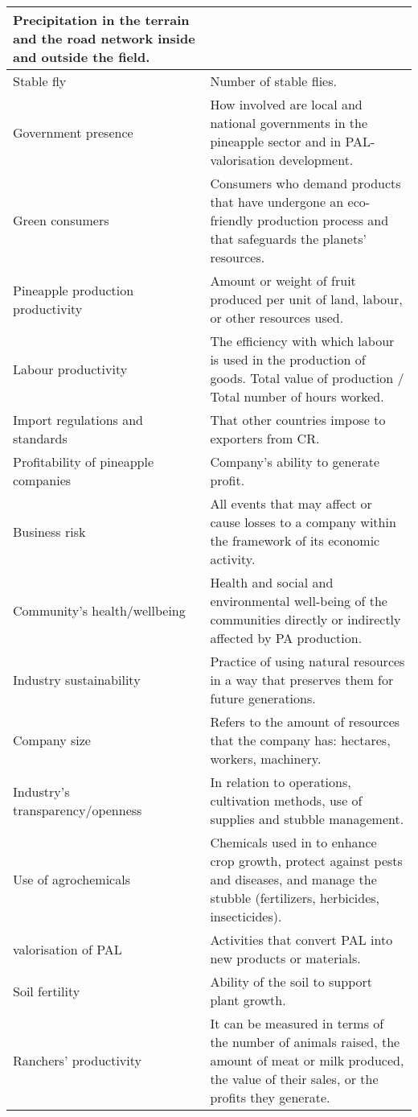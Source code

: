 \begin{xltabular}{\textwidth}{XX}
  Precipitation in the terrain and the road network inside and outside the field. \\ \hline
Stable fly &
  Number of stable flies. \\ \hline
Government presence &
  How involved are local and national governments in the pineapple sector and in PAL-valorisation development. \\ \hline
Green consumers &
  Consumers who demand products that have undergone an eco-friendly production process and that safeguards the planets' resources. \\ \hline
Pineapple production productivity &
  Amount or weight of fruit produced per unit of land, labour, or other resources used. \\ \hline
Labour productivity &
  The efficiency with which labour is used in the production of goods. Total value of production / Total number of hours worked. \\ \hline
Import regulations and standards &
  That other countries impose to exporters from CR. \\ \hline
Profitability of pineapple companies &
  Company's ability to generate profit. \\ \hline
Business risk &
  All events that may affect or cause losses to a company within the framework of its economic activity. \\ \hline
Community's health/wellbeing &
  Health and social and environmental well-being of the communities directly or indirectly affected by PA production. \\ \hline
Industry sustainability &
  Practice of using natural resources in a way that preserves them for future generations. \\ \hline
Company  size &
  Refers to the amount of resources that the company has: hectares, workers, machinery. \\ \hline
Industry's transparency/openness &
  In relation to operations, cultivation methods, use of supplies and stubble management. \\ \hline
Use of agrochemicals &
  Chemicals used in to enhance crop growth, protect against pests and diseases, and manage the stubble (fertilizers, herbicides, insecticides). \\ \hline
valorisation of PAL &
  Activities that convert PAL into new products or materials. \\ \hline
Soil fertility &
  Ability of the soil to support plant growth. \\ \hline
Ranchers' productivity &
  It can be measured in terms of the number of animals raised, the amount of meat or milk produced, the value of their sales, or the profits they generate.

\end{xltabular}

